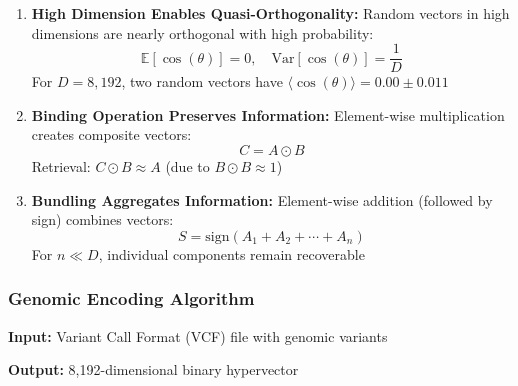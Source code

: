 \documentclass[11pt,a4paper]{article}
\begin{document}
\begin{enumerate}
    \item \textbf{High Dimension Enables Quasi-Orthogonality:} Random vectors in high dimensions are nearly orthogonal with high probability:
    \begin{equation}
        \mathbb{E}[\cos(\theta)] = 0, \quad \text{Var}[\cos(\theta)] = \frac{1}{D}
    \end{equation}
    For $D=8,192$, two random vectors have $\langle\cos(\theta)\rangle = 0.00 \pm 0.011$

    \item \textbf{Binding Operation Preserves Information:} Element-wise multiplication creates composite vectors:
    \begin{equation}
        C = A \odot B
    \end{equation}
    Retrieval: $C \odot B \approx A$ (due to $B \odot B \approx 1$)

    \item \textbf{Bundling Aggregates Information:} Element-wise addition (followed by sign) combines vectors:
    \begin{equation}
        S = \text{sign}(A_1 + A_2 + \cdots + A_n)
    \end{equation}
    For $n \ll D$, individual components remain recoverable
\end{enumerate}

\subsubsection{Genomic Encoding Algorithm}

\textbf{Input:} Variant Call Format (VCF) file with genomic variants

\textbf{Output:} 8,192-dimensional binary hypervector
\end{document}
